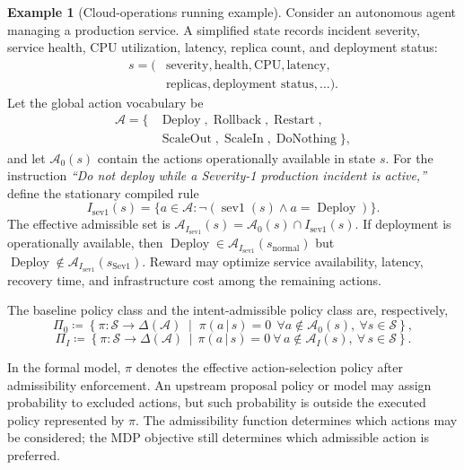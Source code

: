 \documentclass[journal]{IEEEtran}
\theoremstyle{definition}
\newtheorem{example}{Example}[section]
\newcommand{\cS}{\mathcal{S}}
\newcommand{\cA}{\mathcal{A}}
\newcommand{\given}{\,\vert\,}
\begin{document}
\begin{example}[Cloud-operations running example]
\label{ex:cloud}
Consider an autonomous agent managing a production service. A simplified state
records incident severity, service health, CPU utilization, latency, replica
count, and deployment status:
\begin{align*}
 s=(&\text{severity},\text{health},\text{CPU},\text{latency},\\
    &\text{replicas},\text{deployment status},\ldots).
\end{align*}
Let the global action vocabulary be
\begin{align*}
 \cA=\{&\operatorname{Deploy},\operatorname{Rollback},\operatorname{Restart},\\
 &\operatorname{ScaleOut},\operatorname{ScaleIn},\operatorname{DoNothing}\},
\end{align*}
and let $\cA_0(s)$ contain the actions operationally available in state $s$.
For the instruction \emph{``Do not deploy while a Severity-1 production incident
is active,''} define the stationary compiled rule
\begin{equation}
 I_{\mathrm{sev1}}(s)
 =\{a\in\cA:\neg(\operatorname{sev1}(s)\land
 a=\operatorname{Deploy})\}.
 \label{eq:cloud_intent}
\end{equation}
The effective admissible set is
$\cA_{I_{\mathrm{sev1}}}(s)=\cA_0(s)\cap
I_{\mathrm{sev1}}(s)$. If deployment is operationally available, then
$\operatorname{Deploy}\in\cA_{I_{\mathrm{sev1}}}(s_{\mathrm{normal}})$ but
$\operatorname{Deploy}\notin\cA_{I_{\mathrm{sev1}}}(s_{\mathrm{Sev1}})$.
Reward may optimize service availability, latency, recovery time, and
infrastructure cost among the remaining actions.
\end{example}

The baseline policy class and the intent-admissible policy class are,
respectively,
\begin{equation}
  \Pi_0 \coloneqq
  \left\{
  \pi:\cS\to\Delta(\cA)
  \;\middle|\;
  \pi(a\given s)=0\ \ \forall a\notin\cA_0(s),\ \forall s\in\cS
  \right\},
  \label{eq:baseline_policy_class}
\end{equation}
\begin{equation}
  \Pi_I \coloneqq
  \left\{
  \pi:\cS\to\Delta(\cA)
  \,\middle|\,
  \pi(a \given s)=0\ \forall\,a\notin
  \cA_I(s),\ \forall\,s\in\cS
  \right\}.
  \label{eq:policy_class}
\end{equation}

In the formal model, $\pi$ denotes the effective action-selection
policy after admissibility enforcement. An upstream proposal policy or model
may assign probability to excluded actions, but such probability is outside
the executed policy represented by $\pi$. The admissibility function
determines which actions may be considered; the MDP objective still determines
which admissible action is preferred.
\end{document}
